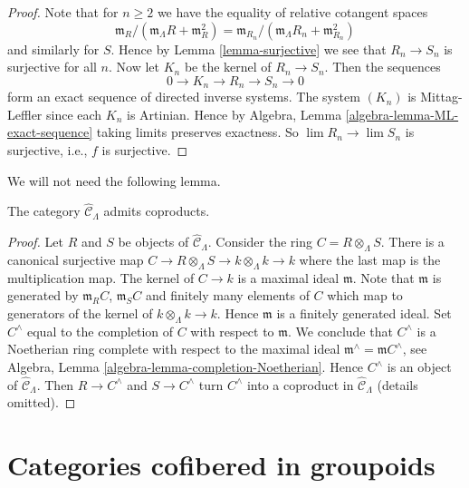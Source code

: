\begin{proof}
Note that for $n \geq 2$ we have the equality of relative cotangent spaces
$$
\mathfrak m_R/(\mathfrak m_\Lambda R + \mathfrak m_R^2)
=
\mathfrak m_{R_n}/(\mathfrak m_\Lambda R_n + \mathfrak m_{R_n}^2)
$$
and similarly for $S$. Hence by
Lemma \ref{lemma-surjective}
we see that $R_n \to S_n$ is surjective for all $n$.
Now let $K_n$ be the kernel of $R_n \to S_n$.  Then the sequences 
$$
0 \to K_n \to R_n \to S_n \to 0
$$
form an exact sequence of directed inverse systems. The system $(K_n)$ is 
Mittag-Leffler since each $K_n$ is Artinian. Hence by
Algebra, Lemma \ref{algebra-lemma-ML-exact-sequence}
taking limits preserves exactness. So
$\lim R_n \to \lim S_n$ is surjective, i.e., $f$ is surjective.
\end{proof}

\noindent
We will not need the following lemma.

\begin{lemma}
\label{lemma-CLambdahat-coproducts}
The category $\widehat{\mathcal{C}}_\Lambda$ admits coproducts.
\end{lemma}

\begin{proof}
Let $R$ and $S$ be objects of $\widehat{\mathcal{C}}_\Lambda$.
Consider the ring $C = R \otimes_\Lambda S$. There is a canonical
surjective map $C \to R \otimes_\Lambda S \to k \otimes_\Lambda k \to k$
where the last map is the multiplication map. The kernel of
$C \to k$ is a maximal ideal $\mathfrak m$. Note that $\mathfrak m$
is generated by $\mathfrak m_R C$, $\mathfrak m_S C$ and finitely many
elements of $C$ which map to generators of the kernel of
$k \otimes_\Lambda k \to k$. Hence $\mathfrak m$ is a finitely
generated ideal. Set
$C^\wedge$ equal to the completion of $C$ with respect to $\mathfrak m$.
We conclude that $C^\wedge$ is a Noetherian ring complete with respect to
the maximal ideal $\mathfrak m^\wedge = \mathfrak mC^\wedge$, see
Algebra, Lemma \ref{algebra-lemma-completion-Noetherian}.
Hence $C^\wedge$ is an object of $\widehat{\mathcal{C}}_\Lambda$.
Then $R \to C^\wedge$ and $S \to C^\wedge$ turn $C^\wedge$
into a coproduct in $\widehat{\mathcal{C}}_\Lambda$ (details omitted).
\end{proof}





\section{Categories cofibered in groupoids}
\label{section-preliminary}

